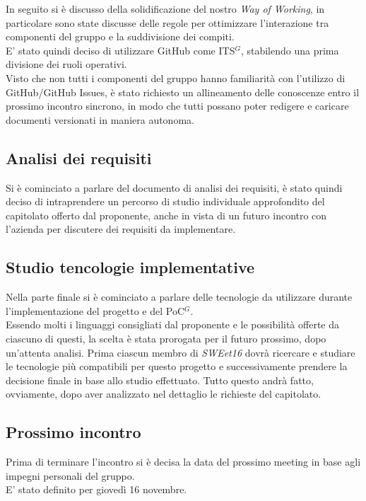 \documentclass[a4paper, 11pt]{article}
\begin{document}
In seguito si è discusso della solidificazione del nostro \textit{Way of Working}, in particolare sono state discusse delle regole per ottimizzare l'interazione tra componenti del gruppo e la suddivisione dei compiti. \\
E' stato quindi deciso di utilizzare GitHub come ITS$^{G}$, stabilendo una prima divisione dei ruoli operativi. \\
Visto che non tutti i componenti del gruppo hanno familiarità con l'utilizzo di GitHub/GitHub Issues, è stato richiesto un allineamento delle conoscenze entro il prossimo incontro sincrono, in modo che tutti possano poter redigere e caricare documenti versionati in maniera autonoma. 

\subsection{Analisi dei requisiti}
Si è cominciato a parlare del documento di analisi dei requisiti, è stato quindi deciso di intraprendere un percorso di studio individuale approfondito del capitolato offerto dal proponente, anche in vista di un futuro incontro con l'azienda per discutere dei requisiti da implementare.

\subsection{Studio tencologie implementative}

Nella parte finale si è cominciato a parlare delle tecnologie da utilizzare durante l'implementazione del progetto e del PoC$^{G}$. \\
Essendo molti i linguaggi consigliati dal proponente e le possibilità offerte da ciascuno di questi, la scelta è stata prorogata per il futuro prossimo, dopo un'attenta analisi.
Prima ciascun membro di \textit{SWEet16} dovrà ricercare e studiare le tecnologie più compatibili per questo progetto e successivamente prendere la decisione finale in base allo studio effettuato. Tutto questo andrà fatto, ovviamente, dopo aver analizzato nel dettaglio le richieste del capitolato.

\subsection{Prossimo incontro}
Prima di terminare l'incontro si è decisa la data del prossimo meeting in base agli impegni personali del gruppo. \\
E' stato definito per giovedì 16 novembre.
\end{document}
